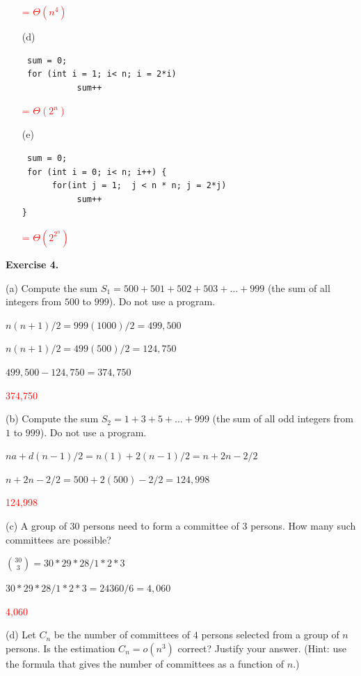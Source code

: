 \documentclass[11pt]{article}
\begin{document}
\begin{itemize}
\textcolor{red}{= $\Theta(n^4)$}

\medskip\item[(d)]
\begin{verbatim}
 sum = 0;
 for (int i = 1; i< n; i = 2*i)
           sum++

\end{verbatim}

\textcolor{red}{= $\Theta(2^n)$}

\medskip\item[(e)]
\begin{verbatim}
 sum = 0;
 for (int i = 0; i< n; i++) {
      for(int j = 1;  j < n * n; j = 2*j)
           sum++
}
\end{verbatim}

\textcolor{red}{= $\Theta(2^2^n)$}
\end{itemize}
\bigskip
\bigskip
\bigskip
\bigskip
\bigskip
\bigskip
\bigskip
\bigskip
\bigskip
\bigskip
\bigskip
\bigskip
\bigskip
\bigskip
\bigskip
\bigskip
\bigskip
\bigskip



\textbf{Exercise 4.}

(a) Compute the sum $S_1 = 500 + 501+ 502 + 503 + \ldots + 999$ (the sum of all integers from $500$ to $999$). Do not use a program.
\medskip

$n(n+1)/2 = 999(1000)/2 = 499,500$

$n(n+1)/2 = 499(500)/2 = 124,750$

$499,500 - 124,750 = 374,750$
\medskip

\textcolor{red}{374,750}
\bigskip

(b) Compute the sum $S_2 = 1 + 3 + 5 + \ldots + 999$  (the sum of all odd integers from $1$ to $999$).   Do not use a program.
\medskip

$na + d(n-1)/2 = n(1) + 2(n-1)/2 = n+2n-2/2$

$n+2n-2/2 = 500+2(500)-2/2 = 124,998$

\medskip

\textcolor{red}{124,998}
\bigskip

(c) A group of $30$ persons need to form a committee of $3$ persons. How many such committees are possible?
\medskip

\smallskip

$\binom{30}{3} = 30 * 29 * 28/1 * 2 * 3$
\smallskip

$30 * 29 * 28/1 * 2 * 3 = 24360/6 = 4,060$
\medskip

\textcolor{red}{4,060}
\bigskip

(d) Let $C_n$ be the number of committees of $4$ persons selected from a group of $n$ persons.  Is the estimation
$C_n = o(n^3)$ correct? Justify your answer. (Hint: use the formula that gives the number of committees as a function of $n$.)
\medskip
\end{document}
